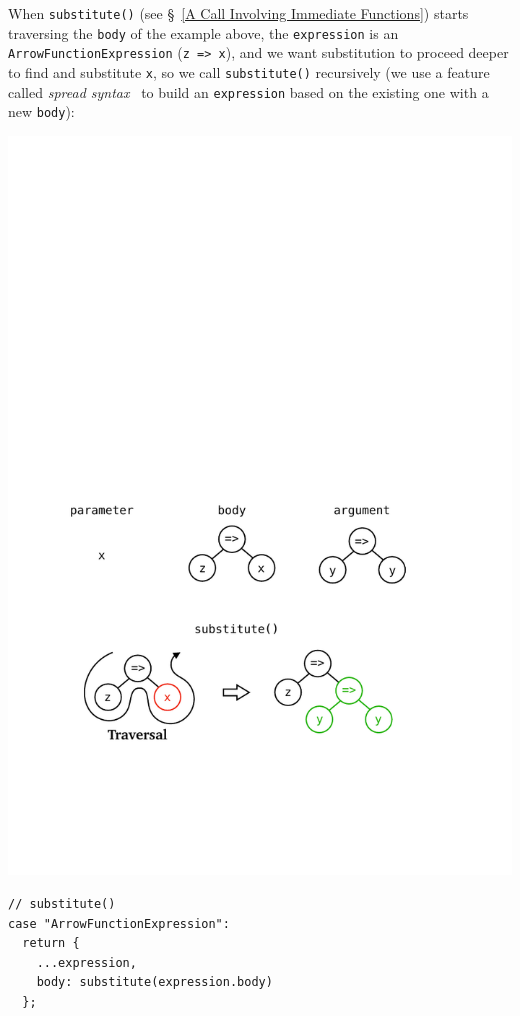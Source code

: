 \documentclass[12pt, oneside]{book}
\begin{document}
When \texttt{substitute()} (see §~\ref{A Call Involving Immediate Functions}) starts traversing the \texttt{body} of the example above, the \texttt{expression} is an \texttt{ArrowFunctionExpression} (\texttt{z => x}), and we want substitution to proceed deeper to find and substitute \texttt{x}, so we call \texttt{substitute()} recursively (we use a feature called \emph{spread syntax}~\cite{spread-syntax} to build an \texttt{expression} based on the existing one with a new \texttt{body}):

\begin{center}
\includegraphics{images/substitution-in-function-definitions.pdf}
\end{center}

\begin{verbatim}
// substitute()
case "ArrowFunctionExpression":
  return {
    ...expression,
    body: substitute(expression.body)
  };
\end{verbatim}
\end{document}
